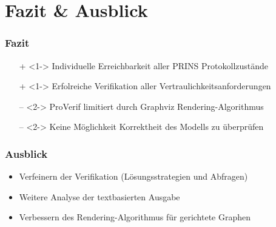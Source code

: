 \documentclass{beamer}
\begin{document}
\section{Fazit \& Ausblick}

\begin{frame}
    \frametitle{Fazit}

    \begin{itemize}
        \item[+]<1-> Individuelle Erreichbarkeit aller PRINS Protokollzustände
        \vspace*{2mm}
        \item[+]<1-> Erfolreiche Verifikation aller Vertraulichkeitsanforderungen
    \end{itemize}
    \vspace*{5mm}
    \begin{itemize}
        \item[--]<2-> ProVerif limitiert durch Graphviz Rendering-Algorithmus
        \vspace*{2mm}
        \item[--]<2-> Keine Möglichkeit Korrektheit des Modells zu überprüfen
    \end{itemize}
\end{frame}

\begin{frame}
    \frametitle{Ausblick}

    \begin{itemize}
        \item Verfeinern der Verifikation (Lösungsstrategien und Abfragen)
        \vspace*{2mm}
        \item Weitere Analyse der textbasierten Ausgabe
        \vspace*{2mm}
        \item Verbessern des Rendering-Algorithmus für gerichtete Graphen
    \end{itemize}
\end{frame}
\end{document}
